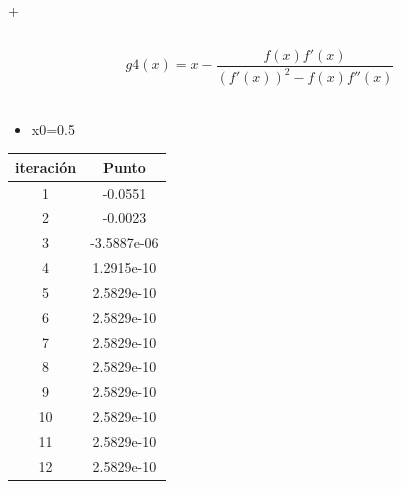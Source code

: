 +\documentclass{udpreport}
\begin{document}
\begin{enumerate}
\begin{enumerate}
\begin{table}[H]
\begin{tabular} { |c|c|}
        \end{tabular}
        
    \end{table}
 \newpage
    
    \newpage
    \begin{equation}
 g4(x) = x-\frac{f(x)f'(x)}
{(f'(x))^2-f(x)f''(x)}
\end{equation}
\\
 \begin{itemize}

\item x0=0.5
\end{itemize}
\begin{table}[H]
    \centering
        \begin{tabular} { |c|c|}
        
        \hline
        iteración  &  Punto\\
        \hline
        1 &  -0.0551      \\
         \hline
        2 &    -0.0023   \\
         \hline
        3 &  -3.5887e-06 \\
         \hline
        4 &  1.2915e-10    \\
         \hline
        5 &    2.5829e-10  \\
         \hline
        6 &  2.5829e-10     \\
         \hline
        7 &     2.5829e-10 \\
         \hline
        8 &  2.5829e-10    \\
         \hline
        9 &       2.5829e-10   \\
         \hline
        10 &    2.5829e-10     \\
         \hline
        11 &    2.5829e-10 \\
         \hline
        12 &   2.5829e-10  \\
        \hline
        
        \end{tabular}
        

\end{table}
\end{enumerate}
\end{enumerate}
\end{document}
